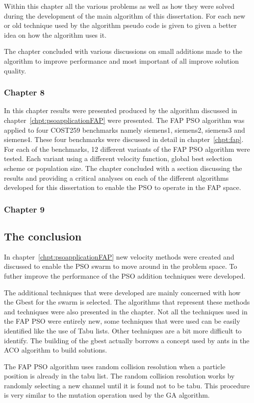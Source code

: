 Within this chapter all the various problems as well as how they were solved during the development of the main algorithm of this dissertation. For each new or old technique used by the algorithm pseudo code is given to given a better idea on how the algorithm uses it.

The chapter concluded with various discussions on small additions made to the algorithm to improve performance and most important of all improve solution quality.
\subsubsection{Chapter 8}
In this chapter results were presented produced by the algorithm discussed in chapter~\ref{chpt:psoapplicationFAP} were presented. The FAP PSO algorithm was applied to four COST259 benchmarks namely siemens1, siemens2, siemens3 and siemens4. These four benchmarks were discussed in detail in chapter~\ref{chpt:fap}. For each of the benchmarks, 12 different variants of the FAP PSO algorithm were tested. Each variant using a different velocity function, global best selection scheme or population size. The chapter concluded with a section discussing the results and providing a critical analyses on each of the different algorithms developed for this dissertation to enable the PSO to operate in the FAP space.
\subsubsection{Chapter 9}
\subsection{The conclusion}
In chapter~\ref{chpt:psoapplicationFAP} new velocity methods were created and discussed to enable the PSO swarm to move around in the problem space. To futher improve the performance of the PSO addition techniques were developed.

The additional techniques that were developed are mainly concerned with how the Gbest for the swarm is selected. The algorithms that represent these methods and techniques were also presented in the chapter. Not all the techniques used in the FAP PSO were entirely new, some techniques that were used can be easily identified like the use of Tabu lists. Other techniques are a bit more difficult to identify. The building of the gbest actually borrows a concept used by ants in the ACO algorithm to build solutions. 

The FAP PSO algorithm uses random collision resolution when a particle position is already in the tabu list. The random collision resolution works by randomly selecting a new channel until it is found not to be tabu. This procedure is very similar to the mutation operation used by the GA algorithm.

